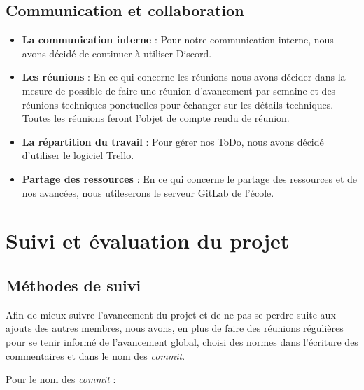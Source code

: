 \documentclass[a4paper, 12pt]{report}
\begin{document}
\subsection{Communication et collaboration}

\begin{itemize}
    \item \textbf{La communication interne} : Pour notre communication interne, nous avons décidé de continuer à utiliser Discord.
    \item \textbf{Les réunions} : En ce qui concerne les réunions nous avons décider dans la mesure de possible de faire une réunion d'avancement par semaine et des réunions techniques ponctuelles pour échanger sur les détails techniques. Toutes les réunions feront l'objet de compte rendu de réunion.
    \item \textbf{La répartition du travail} : Pour gérer nos ToDo, nous avons décidé d'utiliser le logiciel Trello.
    \item \textbf{Partage des ressources} : En ce qui concerne le partage des ressources et de nos avancées, nous utileserons le serveur GitLab de l'école.
\end{itemize}


\clearpage
\section{Suivi et évaluation du projet}

\subsection{Méthodes de suivi}
Afin de mieux suivre l'avancement du projet et de ne pas se perdre suite aux ajouts des autres membres, nous avons, en plus de faire des réunions régulières pour se tenir informé de l'avancement global, choisi des normes dans l'écriture des commentaires et dans le nom des \textit{commit}.
\bigskip

\underline{Pour le nom des \textit{commit}} :
\end{document}
